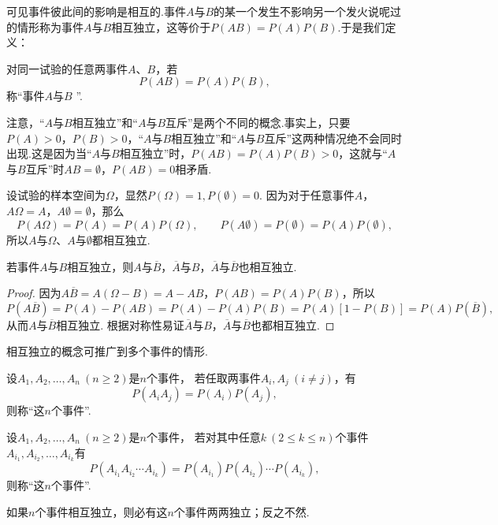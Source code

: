 可见事件彼此间的影响是相互的.事件\(A\)与\(B\)的某一个发生不影响另一个发火说呢过的情形称为事件\(A\)与\(B\)相互独立，这等价于\(P(AB) = P(A) P(B)\).于是我们定义：

\begin{definition}
对同一试验的任意两事件\(A\)、\(B\)，若\[
	P(AB) = P(A) P(B),
\]称“事件\(A\)与\(B\) ”.
\end{definition}

注意，“\(A\)与\(B\)相互独立”和“\(A\)与\(B\)互斥”是两个不同的概念.事实上，只要\(P(A) > 0\)，\(P(B) > 0\)，“\(A\)与\(B\)相互独立”和“\(A\)与\(B\)互斥”这两种情况绝不会同时出现.这是因为当“\(A\)与\(B\)相互独立”时，\(P(AB) = P(A) P(B) > 0\)，这就与“\(A\)与\(B\)互斥”时\(AB = \emptyset\)，\(P(AB) = 0\)相矛盾.

设试验的样本空间为\(\Omega\)，显然\(P(\Omega) = 1, P(\emptyset) = 0\).
因为对于任意事件\(A\)，\(A \Omega = A\)，\(A \emptyset = \emptyset\)，那么\[
P(A \Omega) = P(A) = P(A) P(\Omega), \qquad
P(A \emptyset) = P(\emptyset) = P(A) P(\emptyset),
\]所以\(A\)与\(\Omega\)、\(A\)与\(\emptyset\)都相互独立.

\begin{theorem}
若事件\(A\)与\(B\)相互独立，则\(A\)与\(\overline{B}\)，\(\overline{A}\)与\(B\)，\(\overline{A}\)与\(\overline{B}\)也相互独立.
\begin{proof}
因为\(A\overline{B}=A(\Omega-B)=A-AB\)，\(P(AB)=P(A)P(B)\)，所以\[
P(A\overline{B})
= P(A) - P(AB)
= P(A) - P(A) P(B)
= P(A) [1 - P(B)]
= P(A) P(\overline{B}),
\]从而\(A\)与\(\overline{B}\)相互独立.
根据对称性易证\(\overline{A}\)与\(B\)，\(\overline{A}\)与\(\overline{B}\)也都相互独立.
\end{proof}
\end{theorem}

相互独立的概念可推广到多个事件的情形.
\begin{definition}
设\(A_1,A_2,\dotsc,A_n\ (n \geq 2)\)是\(n\)个事件，
若任取两事件\(A_i,A_j\ (i \neq j)\)，有\[
P(A_i A_j) = P(A_i) P(A_j),
\]则称“这\(n\)个事件”.
\end{definition}

\begin{definition}
设\(A_1,A_2,\dotsc,A_n\ (n \geq 2)\)是\(n\)个事件，
若对其中任意\(k\ (2 \leq k \leq n)\)个事件\(A_{i_1},A_{i_2},\dotsc,A_{i_k}\)有\[
P(A_{i_1} A_{i_2} \dotsm A_{i_k})
= P(A_{i_1}) P(A_{i_2}) \dotsm P(A_{i_k}),
\]则称“这\(n\)个事件”.
\end{definition}

\begin{theorem}
如果\(n\)个事件相互独立，则必有这\(n\)个事件两两独立；反之不然.
\end{theorem}

